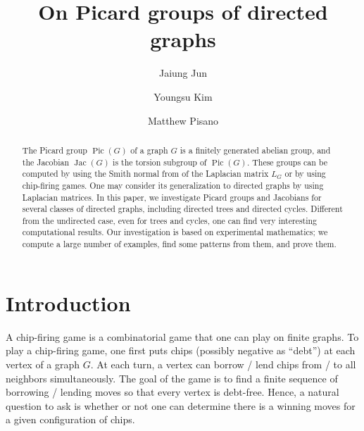 \documentclass[11pt,reqno]{amsart}
\DeclareMathOperator{\Pic}{Pic}
\DeclareMathOperator{\Jac}{Jac}
\theoremstyle{definition}
\theoremstyle{plain}
\begin{document}
\title{On Picard groups of directed graphs}

\author{Jaiung Jun}
\address{Department of Mathematics, State University of New York at New Paltz, NY 12561, USA}

\author{Youngsu Kim}
\address{Department of Mathematics, California State University San Bernardino, San Bernardino, CA 92407}

\author{Matthew Pisano}
\address{Department of Computer Science, State University of New York at New Paltz, NY 12561, USA}

\makeatletter
{}
\makeatother


\maketitle

\begin{abstract}
The Picard group $\Pic(G)$ of a graph $G$ is a finitely generated abelian group, and the Jacobian $\Jac(G)$ is the torsion subgroup of $\Pic(G)$. These groups can be computed by using the Smith normal from of the Laplacian matrix $L_G$ or by using chip-firing games. One may consider its generalization to directed graphs by using Laplacian matrices. In this paper, we investigate Picard groups and Jacobians for several classes of directed graphs, including directed trees and directed cycles. Different from the undirected case, even for trees and cycles, one can find very interesting computational results. Our investigation is based on experimental mathematics; we compute a large number of examples, find some patterns from them, and prove them. 
\end{abstract}

\section{Introduction}



A chip-firing game is a combinatorial game that one can play on finite graphs. To play a chip-firing game, one first puts chips (possibly negative as ``debt'') at each vertex of a graph $G$. At each turn, a vertex can borrow / lend chips from / to all neighbors simultaneously. The goal of the game is to find a finite sequence of borrowing / lending moves so that every vertex is debt-free. Hence, a natural question to ask is whether or not one can determine there is a winning moves for a given configuration of chips. 
\end{document}

